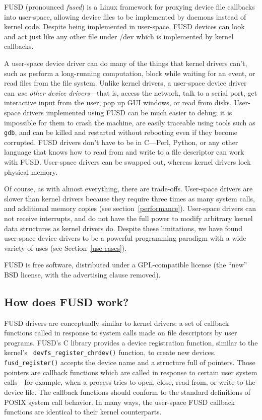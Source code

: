 \documentclass{article}
\begin{document}
FUSD (pronounced {\em fused}) is a Linux framework for proxying device
file callbacks into user-space, allowing device files to be
implemented by daemons instead of kernel code.  Despite being
implemented in user-space, FUSD devices can look and act just like any
other file under /dev which is implemented by kernel callbacks.

A user-space device driver can do many of the things that kernel
drivers can't, such as perform a long-running computation, block while
waiting for an event, or read files from the file system.  Unlike
kernel drivers, a user-space device driver can {\em use other device
drivers}---that is, access the network, talk to a serial port, get
interactive input from the user, pop up GUI windows, or read from
disks.  User-space drivers implemented using FUSD can be much easier
to debug; it is impossible for them to crash the machine, are easily
traceable using tools such as {\tt gdb}, and can be killed and
restarted without rebooting even if they become corrupted.  FUSD
drivers don't have to be in C---Perl, Python, or any other language
that knows how to read from and write to a file descriptor can work
with FUSD.  User-space drivers can be swapped out, whereas kernel
drivers lock physical memory.

Of course, as with almost everything, there are trade-offs.
User-space drivers are slower than kernel drivers because they require
three times as many system calls, and additional memory copies (see
section~\ref{performance}).  User-space drivers can not receive
interrupts, and do not have the full power to modify arbitrary kernel
data structures as kernel drivers do.  Despite these limitations, we
have found user-space device drivers to be a powerful programming
paradigm with a wide variety of uses (see Section~\ref{use-cases}).

FUSD is free software, distributed under a GPL-compatible license (the
``new'' BSD license, with the advertising clause removed).

\subsection{How does FUSD work?}

FUSD drivers are conceptually similar to kernel drivers: a set of
callback functions called in response to system calls made on file
descriptors by user programs.  FUSD's C library provides a device
registration function, similar to the kernel's {\tt
devfs\_register\_chrdev()} function, to create new devices.  {\tt
fusd\_register()} accepts the device name and a structure full of
pointers.  Those pointers are callback functions which are called in
response to certain user system calls---for example, when a process
tries to open, close, read from, or write to the device file.  The
callback functions should conform to the standard definitions of POSIX
system call behavior.  In many ways, the user-space FUSD callback
functions are identical to their kernel counterparts.
\end{document}

